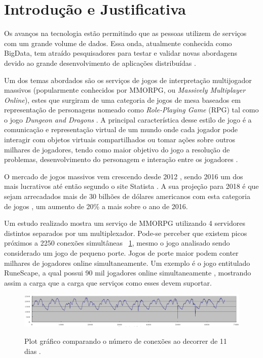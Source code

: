\section{Introdução e Justificativa}
\label{sec:int}

Os avanços na tecnologia estão permitindo que as pessoas utilizem de serviços com um grande volume de dados. Essa onda, atualmente conhecida como BigData, tem atraído pesquisadores para testar e validar novas abordagens devido ao grande desenvolvimento de aplicações distribuídas \cite{mmo_analytic}.

Um dos temas abordados são os serviços de jogos de interpretação multijogador massivos (popularmente conhecidos por MMORPG, ou \textit{Massively Multiplayer Online}), estes que surgiram de uma categoria de jogos de mesa baseados em representação de personagens nomeado como \textit{Role-Playing Game} (RPG) tal como o jogo \textit{Dungeon and Dragons} \cite{tsr1980dungeons}. A principal característica desse estilo de jogo é a comunicação e representação virtual de um mundo onde cada jogador pode interagir com objetos virtuais compartilhados ou tomar ações sobre outros milhares de jogadores, tendo como maior objetivo do jogo a resolução de problemas, desenvolvimento do personagem e interação entre os jogadores \cite{video_game_technologies}.

O mercado de jogos massivos vem crescendo desde 2012 \cite{new_york_times}, sendo 2016 um dos mais lucrativos até então segundo o site Statista \cite{statista_2016}. A sua projeção para 2018 é que sejam arrecadados mais de 30 bilhões de dólares americanos com esta categoria de jogos \cite{statista_2018}, um aumento de 20\% a mais sobre o ano de 2016.

Um estudo realizado \cite{system_performance} mostra um serviço de MMORPG utilizando 4 servidores distintos separados por um multiplexador. Pode-se perceber que existem picos próximos a 2250 conexões simultâneas ~\ref{fig:conection_peer_hour}, mesmo o jogo analisado sendo considerado um jogo de pequeno porte. Jogos de porte maior podem conter milhares de jogadores online simultaneamente. Um exemplo é o jogo entitulado RuneScape, a qual possui 90 mil jogadores online simultaneamente \cite{runescape_online_users}, mostrando assim a carga que a carga que serviços como esses devem suportar.

\begin{figure}[h]
  \caption{Plot gráfico comparando o número de conexões ao decorrer de 11 dias
  \cite{system_performance}.}
  \centering
  \includegraphics[width=1\textwidth]{img/connection_peer_hour.png}
  \label{fig:conection_peer_hour}
\end{figure}

